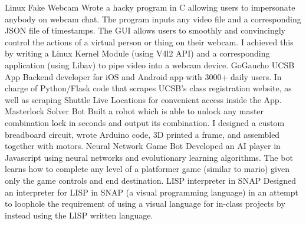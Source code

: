 


\begin{cvskills}

  \vspace{1mm}
  \cvskill 
    {Linux Fake Webcam} %
    {Wrote a hacky program in C allowing users to impersonate anybody on webcam chat. The program inputs any video file and a corresponding JSON file of timestamps. The GUI allows users to smoothly and convincingly control the actions of a virtual person or thing on their webcam. I achieved this by writing a Linux Kernel Module (using V4l2 API) and a corresponding application (using Libav) to pipe video into a webcam device.} %
  \vspace{1mm}
  \cvskill
    {GoGaucho UCSB App} %
    {Backend developer for iOS and Android app with 3000+ daily users. In charge of Python/Flask code that scrapes UCSB's class registration website, as well as scraping Shuttle Live Locations for convenient access inside the App.} %
\cvskill
    {Masterlock Solver Bot} %
    {Built a robot which is able to unlock any master combination lock in seconds and output its combination. I designed a custom breadboard circuit, wrote Arduino code, 3D printed a frame, and assembled together with motors.} %
  \vspace{1mm}
\cvskill
  {Neural Network Game Bot}
  {Developed an AI player in Javascript using neural networks and evolutionary learning algorithms. The bot learns how to complete any level of a platformer game (similar to mario) given only the game controls and end destination.}
  \vspace{1mm}
  \cvskill
    {LISP interpreter in SNAP} %
    {Designed an interpreter for LISP in SNAP (a visual programming language) in an attempt to loophole the requirement of using a visual language for in-class projects by instead using the LISP written language.} %
  \vspace{1mm}

\end{cvskills}
